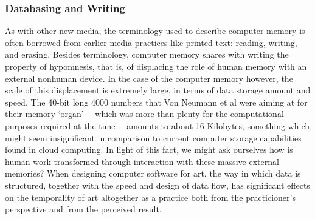\subsubsection{Databasing and Writing}

As with other new media, the terminology used to describe computer memory is often borrowed from earlier media practices like printed text: reading, writing, and erasing. Besides terminology, computer memory shares with writing the property of hypomnesis, that is, of displacing the role of human memory with an external nonhuman device. In the case of the computer memory however, the scale of this displacement is extremely large, in terms of data storage amount and speed. The 40-bit long 4000 numbers that Von Neumann et al were aiming at for their memory `organ' ---which was more than plenty for the computational purposes required at the time--- amounts to about 16 Kilobytes, something which might seem insignificant in comparison to current computer storage capabilities found in cloud computing. In light of this fact, we might ask ourselves how is human work transformed through interaction with these massive external memories? When designing computer software for art, the way in which data is structured, together with the speed and design of data flow, has significant effects on the temporality of art altogether as a practice both from the practicioner's perspective and from the perceived result.

